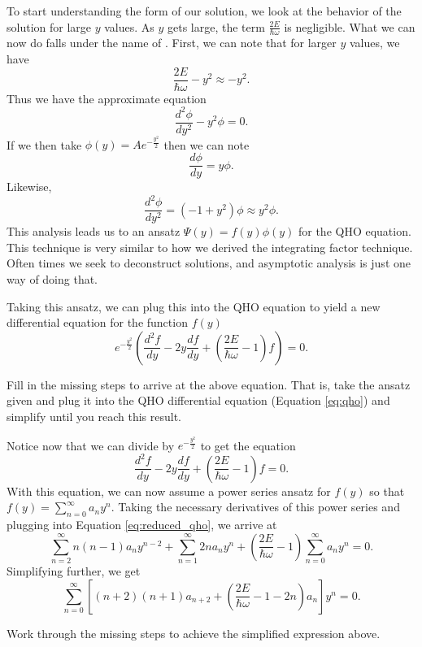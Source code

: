 To start understanding the form of our solution, we look at the behavior of the solution for large $y$ values. As  $y$ gets large, the term $\frac{2E}{\hbar \omega}$ is negligible.  What we can now do falls under the name of  .  First, we can note that for larger $y$ values, we have
\[
\frac{2E}{\hbar \omega} - y^2 \approx -y^2.
\]
Thus we have the approximate equation
\[
\frac{d^2 \phi}{dy^2} - y^2 \phi = 0.
\]
If we then take $\phi(y)=Ae^{-\frac{y^2}{2}}$ then we can note
\[
\frac{d \phi}{d y} = y \phi.
\]
Likewise,
\[
\frac{d^2 \phi}{dy^2} = (-1 + y^2)\phi \approx y^2 \phi.
\]
This analysis leads us to an ansatz $\Psi(y)=f(y)\phi(y)$ for the QHO equation.  This technique is very similar to how we derived the integrating factor technique.  Often times we seek to deconstruct solutions, and asymptotic analysis is just one way of doing that. 

Taking this ansatz, we can plug this into the QHO equation to yield a new differential equation for the function $f(y)$
\[
e^{-\frac{y^2}{2}} \left(\frac{d^2 f}{dy} - 2y \frac{df}{dy} + \left(\frac{2E}{\hbar \omega} -1\right) f\right) = 0.
\]

\begin{exercise}
    Fill in the missing steps to arrive at the above equation.  That is, take the ansatz given and plug it into the QHO differential equation (Equation \ref{eq:qho}) and simplify until you reach this result.
\end{exercise}

Notice now that we can divide by $e^{-\frac{y^2}{2}}$ to get the equation
\begin{equation}
\label{eq:reduced_qho}
\frac{d^2 f}{dy} - 2y \frac{df}{dy} + \left(\frac{2E}{\hbar \omega} -1\right) f = 0.
\end{equation}
With this equation, we can now assume a power series ansatz for $f(y)$ so that $f(y) = \sum_{n=0}^\infty a_n y^n$.  Taking the necessary derivatives of this power series and plugging into Equation \ref{eq:reduced_qho}, we arrive at
\[
\sum_{n=2}^\infty n(n-1) a_n y^{n-2} +\sum_{n=1}^\infty 2n a_n y^n + \left(\frac{2E}{\hbar \omega} -1 \right) \sum_{n=0}^\infty a_n y^n =0.
\]
Simplifying further, we get
\[
\sum_{n=0}^\infty \left[ (n+2)(n+1) a_{n+2} + \left(\frac{2E}{\hbar \omega} -1-2n\right)a_n \right]y^n = 0.
\]

\begin{exercise}
    Work through the missing steps to achieve the simplified expression above.
\end{exercise}

